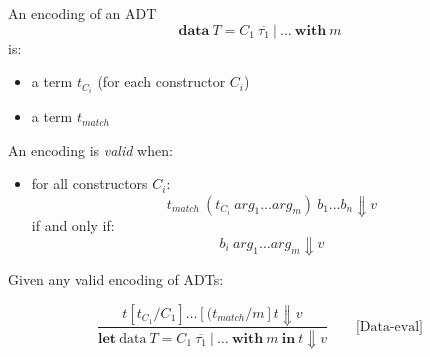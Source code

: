 \documentclass{article}
\begin{document}
An encoding of an ADT
\[
  \textbf{data}\ T = C_1\ \overline{\tau_{1}} \ |\ \dots\ \textbf{with}\ m
\]
is:

\begin{itemize}
  \item a term $t_{C_i}$ (for each constructor $C_i$)
  \item a term $t_{match}$
\end{itemize}

\noindent An encoding is \emph{valid} when:
\begin{itemize}
  \item for all constructors $C_i$:
    \[
      { t_{match}~ (t_{C_i}~ arg_1 \dots arg_m)~ b_1 \dots b_n \Downarrow v
    }
  \]
    if and only if:
    \[
    {b_i~ arg_1 \dots arg_m \Downarrow v
    }
  \]
\end{itemize}


\noindent Given any valid encoding of ADTs:

\[\frac{t [t_{C_1} / C_1] \dots [(t_{match} / m] t
       \Downarrow
       v}
       {\textbf{let}\ \text{data}\ T = C_1\ \overline{\tau_{1}} \ |\ \dots\ \textbf{with}\ m\ \textbf{in}\ t
       \Downarrow
       v}
  \qquad\text{[Data-eval]}
\]
\end{document}
